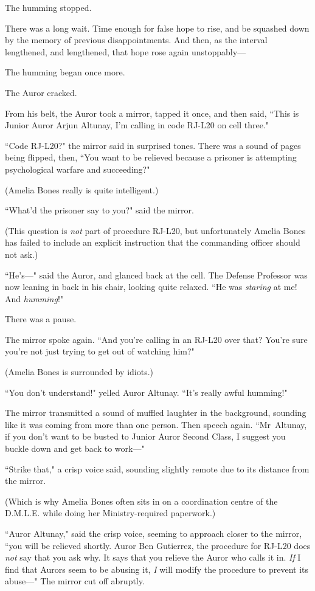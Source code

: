 The humming stopped.

There was a long wait. Time enough for false hope to rise, and be squashed down by the memory of previous disappointments. And then, as the interval lengthened, and lengthened, that hope rose again unstoppably—

The humming began once more.

The Auror cracked.

From his belt, the Auror took a mirror, tapped it once, and then said, ``This is Junior Auror Arjun Altunay, I'm calling in code RJ-L20 on cell three."

``Code RJ-L20?" the mirror said in surprised tones. There was a sound of pages being flipped, then, ``You want to be relieved because a prisoner is attempting psychological warfare and succeeding?"

(Amelia Bones really is quite intelligent.)

``What'd the prisoner say to you?" said the mirror.

(This question is \emph{not} part of procedure RJ-L20, but unfortunately Amelia Bones has failed to include an explicit instruction that the commanding officer should not ask.)

``He's—" said the Auror, and glanced back at the cell. The Defense Professor was now leaning in back in his chair, looking quite relaxed. ``He was \emph{staring} at me! And \emph{humming}!"

There was a pause.

The mirror spoke again. ``And you're calling in an RJ-L20 over that? You're sure you're not just trying to get out of watching him?"

(Amelia Bones is surrounded by idiots.)

``You don't understand!" yelled Auror Altunay. ``It's really awful humming!"

The mirror transmitted a sound of muffled laughter in the background, sounding like it was coming from more than one person. Then speech again. ``Mr~Altunay, if you don't want to be busted to Junior Auror Second Class, I suggest you buckle down and get back to work—"

``Strike that," a crisp voice said, sounding slightly remote due to its distance from the mirror.

(Which is why Amelia Bones often sits in on a coordination centre of the D.M.L.E. while doing her Ministry-required paperwork.)

``Auror Altunay," said the crisp voice, seeming to approach closer to the mirror, ``you will be relieved shortly. Auror Ben Gutierrez, the procedure for RJ-L20 does \emph{not} say that you ask why. It says that you relieve the Auror who calls it in. \emph{If} I find that Aurors seem to be abusing it, \emph{I} will modify the procedure to prevent its abuse—" The mirror cut off abruptly.

